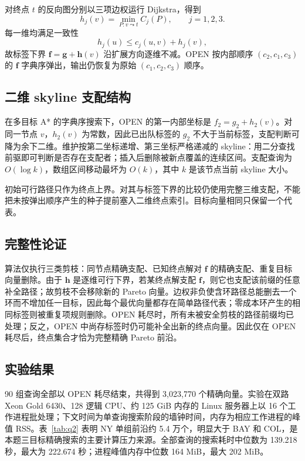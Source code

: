 \documentclass[UTF8,a4paper]{ctexart}
\begin{document}
对终点 $t$ 的反向图分别以三项边权运行 Dijkstra，得到
\begin{equation}
h_j(v)=\min_{P:v\leadsto t}C_j(P),\qquad j=1,2,3.
\end{equation}
每一维均满足一致性
\begin{equation}
h_j(u)\le c_j(u,v)+h_j(v),
\end{equation}
故标签下界 $\bm f=\bm g+\bm h(v)$ 沿扩展方向逐维不减。OPEN 按内部顺序 $(c_2,c_1,c_3)$ 的 $\bm f$ 字典序弹出，输出仍恢复为原始 $(c_1,c_2,c_3)$ 顺序。

\subsection{二维 skyline 支配结构}

在多目标 A* 的字典序搜索下\cite{namoadr,dimreduce}，OPEN 的第一内部坐标是 $f_2=g_2+h_2(v)$。对同一节点 $v$，$h_2(v)$ 为常数，因此已出队标签的 $g_2$ 不大于当前标签，支配判断可降为余下二维。维护按第二坐标递增、第三坐标严格递减的 skyline：用二分查找前驱即可判断是否存在支配者；插入后删除被新点覆盖的连续区间。支配查询为 $O(\log k)$，数组区间移动最坏为 $O(k)$，其中 $k$ 是该节点当前 skyline 大小。

初始可行路径只作为终点上界。对其与标签下界的比较仍使用完整三维支配，不能把未按弹出顺序产生的种子提前塞入二维终点索引。目标向量相同只保留一个代表。

\subsection{完整性论证}

算法仅执行三类剪枝：同节点精确支配、已知终点解对 $\bm f$ 的精确支配、重复目标向量删除。由于 $\bm h$ 是逐维可行下界，若某终点解支配 $\bm f$，则它也支配该前缀的任意补全路径；故剪枝不会移除新的 Pareto 向量。边权非负使含环路径总能删去一个环而不增加任一目标，因此每个最优向量都存在简单路径代表；零成本环产生的相同标签则被重复项规则删除。OPEN 耗尽时，所有未被安全剪枝的路径前缀均已处理；反之，OPEN 中尚存标签时仍可能补全出新的终点向量。因此仅在 OPEN 耗尽后，终点集合才恰为完整精确 Pareto 前沿。

\subsection{实验结果}

90 组查询全部以 OPEN 耗尽结束，共得到 3,023,770 个精确向量。实验在双路 Xeon Gold 6430、128 逻辑 CPU、约 125 GiB 内存的 Linux 服务器上以 16 个工作进程批处理；下文时间为单查询搜索阶段的墙钟时间，内存为相应工作进程的峰值 RSS。表~\ref{tab:q2} 表明 NY 单组前沿约 5.4 万个，明显大于 BAY 和 COL，是本题三目标精确搜索的主要计算压力来源。全部查询的搜索耗时中位数为 139.218 秒，最大为 222.674 秒；进程峰值内存中位数 164 MiB，最大 202 MiB。
\end{document}
